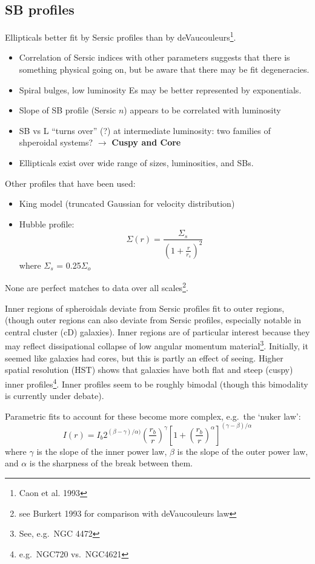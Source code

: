 \documentclass{article}
\newcommand{\mynotes}[1]{\textcolor{cadmiumorange}{#1}}
\begin{document}
\subsection{SB profiles}
Ellipticals better fit by Sersic profiles than by
deVaucouleurs\footnote{Caon et al. 1993}.
\begin{itemize}
    \item Correlation of Sersic indices with other parameters
        suggests that there is something physical going on, but be aware that
        there may be fit degeneracies.
    \item Spiral bulges, low luminosity Es may be better
        represented by exponentials.
    \item Slope of SB profile (Sersic $n$) appears to be correlated with
        luminosity
    \item SB vs L ``turns over'' \mynotes{(?)} at intermediate luminosity:
        two families of shperoidal systems? \mynotes{
            $\rightarrow$ \textbf{Cuspy and Core}}
    \item Ellipticals exist over wide range of sizes, luminosities, and SBs.
\end{itemize}
Other profiles that have been used:
\begin{itemize}
    \item King model (truncated Gaussian for velocity distribution)
    \item Hubble profile:
        \[
            \Sigma(r) = \frac{\Sigma_{s}}{\left(1+\frac{r}{r_{s}}\right)^{2}}
        \]
        where $\Sigma_{s}$ = 0.25$\Sigma_{o}$
\end{itemize}
None are perfect matches to data over all scales\footnote{see Burkert 1993 for
comparison with deVaucouleurs law}.

Inner regions of spheroidals deviate from Sersic profiles fit to outer regions,
(though outer regions can also deviate from Sersic profiles,
especially notable in central cluster (cD) galaxies).
Inner regions are of particular interest because they may reflect dissipational
collapse of low angular momentum material\footnote{See, e.g.\ NGC 4472}.
Initially, it seemed like
galaxies had cores, but this is partly an effect of seeing. Higher spatial
resolution (HST) shows that galaxies have both flat and steep (cuspy) inner
profiles\footnote{e.g.\ NGC720 vs.\ NGC4621}.
Inner profiles seem to be roughly bimodal (though this bimodality is currently
under debate).

Parametric fits to account for these become more complex,
e.g.\ the `nuker law':
\[
    I(r) = I_{b}2^{(\beta-\gamma)/\alpha)}
    \left(\frac{r_{b}}{r}\right)^{\gamma}
    \left[1+\left(\frac{r_{b}}{r}\right)^{\alpha}\right]
    ^{\left(\gamma-\beta\right)/\alpha}
\]
where $\gamma$ is the slope of the inner power law, $\beta$ is
the slope of the outer power law, and $\alpha$ is the sharpness
of the break between them.
\end{document}
